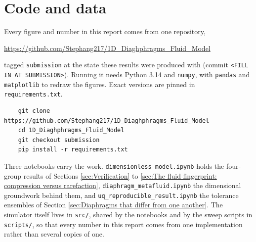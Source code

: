 %
%
%

\section{Code and data}
\label{app:Appendix C}

Every figure and number in this report comes from one repository,
%
\begin{center}
  \url{https://github.com/Stephang217/1D_Diaghphragms_Fluid_Model}
\end{center}
%
tagged \texttt{submission} at the state these results were produced with
(commit \texttt{<FILL IN AT SUBMISSION>}). Running it needs Python 3.14 and
\texttt{numpy}, with \texttt{pandas} and \texttt{matplotlib} to redraw the
figures. Exact versions are pinned in \texttt{requirements.txt}.

\begin{verbatim}
    git clone https://github.com/Stephang217/1D_Diaghphragms_Fluid_Model
    cd 1D_Diaghphragms_Fluid_Model
    git checkout submission
    pip install -r requirements.txt
\end{verbatim}

Three notebooks carry the work. \texttt{dimensionless\_model.ipynb} holds the
four-group results of Sections \ref{sec:Verification} to
\ref{sec:The fluid fingerprint: compression versus rarefaction},
\texttt{diaphragm\_metafluid.ipynb} the dimensional groundwork behind them, and
\texttt{uq\_reproducible\_result.ipynb} the tolerance ensembles of
Section \ref{sec:Diaphragms that differ from one another}. The simulator itself
lives in \texttt{src/}, shared by the notebooks and by the sweep scripts in
\texttt{scripts/}, so that every number in this report comes from one
implementation rather than several copies of one.

